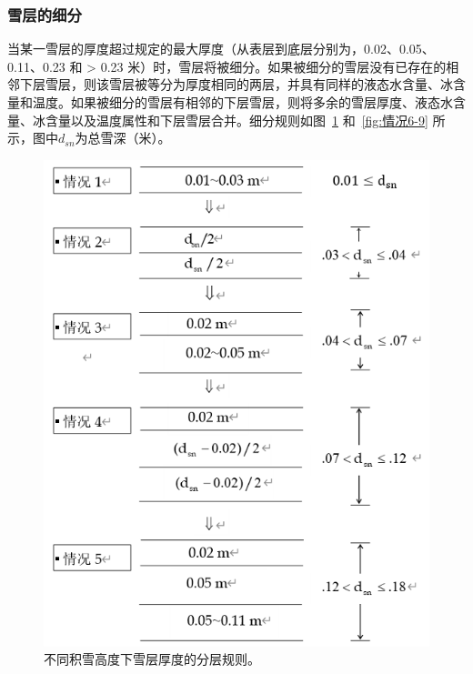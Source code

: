 \subsubsection{雪层的细分}
当某一雪层的厚度超过规定的最大厚度（从表层到底层分别为，0.02、0.05、0.11、0.23 和 > 0.23 米）时，雪层将被细分。如果被细分的雪层没有已存在的相邻下层雪层，则该雪层被等分为厚度相同的两层，并具有同样的液态水含量、冰含量和温度。如果被细分的雪层有相邻的下层雪层，则将多余的雪层厚度、液态水含量、冰含量以及温度属性和下层雪层合并。细分规则如图~\ref{fig:情况1-5} 和~\ref{fig:情况6-9} 所示，图中$d_{sn}$为总雪深（米）。

{
\begin{figure}[htbp]
\centering
\includegraphics{Figures/雪盖土壤热力过程/情况1-5.png}
\caption{不同积雪高度下雪层厚度的分层规则。}
\label{fig:情况1-5}
\end{figure}
}

